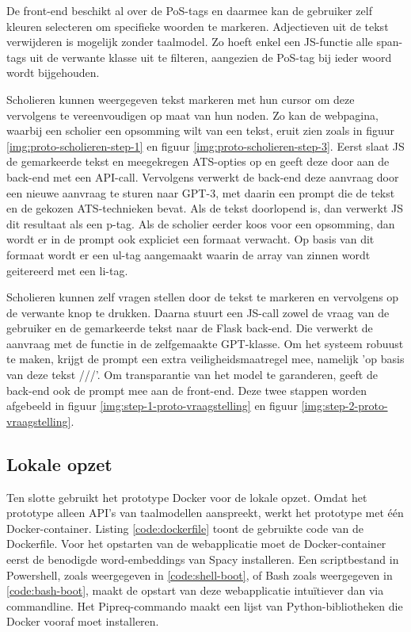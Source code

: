 De front-end beschikt al over de PoS-tags en daarmee kan de gebruiker zelf kleuren selecteren om specifieke woorden te markeren. Adjectieven uit de tekst verwijderen is mogelijk zonder taalmodel. Zo hoeft enkel een JS-functie alle span-tags uit de verwante klasse uit te filteren, aangezien de PoS-tag bij ieder woord wordt bijgehouden.

\medspace

Scholieren kunnen weergegeven tekst markeren met hun cursor om deze vervolgens te vereenvoudigen op maat van hun noden. Zo kan de webpagina, waarbij een scholier een opsomming wilt van een tekst, eruit zien zoals in figuur \ref{img:proto-scholieren-step-1} en figuur \ref{img:proto-scholieren-step-3}. Eerst slaat JS de gemarkeerde tekst en meegekregen ATS-opties op en geeft deze door aan de back-end met een API-call. Vervolgens verwerkt de back-end deze aanvraag door een nieuwe aanvraag te sturen naar GPT-3, met daarin een prompt die de tekst en de gekozen ATS-technieken bevat. Als de tekst doorlopend is, dan verwerkt JS dit resultaat als een p-tag. Als de scholier eerder koos voor een opsomming, dan wordt er in de prompt ook expliciet een formaat verwacht. Op basis van dit formaat wordt er een ul-tag aangemaakt waarin de array van zinnen wordt geitereerd met een li-tag. 

\medspace

Scholieren kunnen zelf vragen stellen door de tekst te markeren en vervolgens op de verwante knop te drukken. Daarna stuurt een JS-call zowel de vraag van de gebruiker en de gemarkeerde tekst naar de Flask back-end. Die verwerkt de aanvraag met de functie in de zelfgemaakte GPT-klasse. Om het systeem robuust te maken, krijgt de prompt een extra veiligheidsmaatregel mee, namelijk 'op basis van deze tekst ///'. Om transparantie van het model te garanderen, geeft de back-end ook de prompt mee aan de front-end. Deze twee stappen worden afgebeeld in figuur \ref{img:step-1-proto-vraagstelling} en figuur \ref{img:step-2-proto-vraagstelling}.

\subsection{Lokale opzet}

Ten slotte gebruikt het prototype Docker voor de lokale opzet. Omdat het prototype alleen API's van taalmodellen aanspreekt, werkt het prototype met één Docker-container. Listing \ref{code:dockerfile} toont de gebruikte code van de Dockerfile. Voor het opstarten van de webapplicatie moet de Docker-container eerst de benodigde word-embeddings van Spacy installeren. Een scriptbestand in Powershell, zoals weergegeven in \ref{code:shell-boot}, of Bash zoals weergegeven in \ref{code:bash-boot}, maakt de opstart van deze webapplicatie intuïtiever dan via commandline. Het Pipreq-commando maakt een lijst van Python-bibliotheken die Docker vooraf moet installeren.